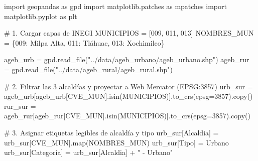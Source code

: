 \documentclass[
  spanish,
  letterpaper,
  DIV=11,
  numbers=noendperiod]{scrartcl}
\newenvironment{Shaded}{\begin{snugshade}}{\end{snugshade}}
\newcommand{\BuiltInTok}[1]{\textcolor[rgb]{0.00,0.23,0.31}{#1}}
\newcommand{\CommentTok}[1]{\textcolor[rgb]{0.37,0.37,0.37}{#1}}
\newcommand{\DecValTok}[1]{\textcolor[rgb]{0.68,0.00,0.00}{#1}}
\newcommand{\ImportTok}[1]{\textcolor[rgb]{0.00,0.46,0.62}{#1}}
\newcommand{\NormalTok}[1]{\textcolor[rgb]{0.00,0.23,0.31}{#1}}
\newcommand{\OperatorTok}[1]{\textcolor[rgb]{0.37,0.37,0.37}{#1}}
\newcommand{\StringTok}[1]{\textcolor[rgb]{0.13,0.47,0.30}{#1}}
\begin{document}
\begin{Shaded}
\begin{Highlighting}[]
\ImportTok{import}\NormalTok{ geopandas }\ImportTok{as}\NormalTok{ gpd}
\ImportTok{import}\NormalTok{ matplotlib.patches }\ImportTok{as}\NormalTok{ mpatches}
\ImportTok{import}\NormalTok{ matplotlib.pyplot }\ImportTok{as}\NormalTok{ plt}

\CommentTok{\# 1. Cargar capas de INEGI}
\NormalTok{MUNICIPIOS }\OperatorTok{=}\NormalTok{ [}\StringTok{\textquotesingle{}009\textquotesingle{}}\NormalTok{, }\StringTok{\textquotesingle{}011\textquotesingle{}}\NormalTok{, }\StringTok{\textquotesingle{}013\textquotesingle{}}\NormalTok{]}
\NormalTok{NOMBRES\_MUN }\OperatorTok{=}\NormalTok{ \{}\StringTok{\textquotesingle{}009\textquotesingle{}}\NormalTok{: }\StringTok{\textquotesingle{}Milpa Alta\textquotesingle{}}\NormalTok{, }\StringTok{\textquotesingle{}011\textquotesingle{}}\NormalTok{: }\StringTok{\textquotesingle{}Tláhuac\textquotesingle{}}\NormalTok{, }\StringTok{\textquotesingle{}013\textquotesingle{}}\NormalTok{: }\StringTok{\textquotesingle{}Xochimilco\textquotesingle{}}\NormalTok{\}}

\NormalTok{ageb\_urb }\OperatorTok{=}\NormalTok{ gpd.read\_file(}\StringTok{"../data/ageb\_urbano/ageb\_urbano.shp"}\NormalTok{)}
\NormalTok{ageb\_rur }\OperatorTok{=}\NormalTok{ gpd.read\_file(}\StringTok{"../data/ageb\_rural/ageb\_rural.shp"}\NormalTok{)}

\CommentTok{\# 2. Filtrar las 3 alcaldías y proyectar a Web Mercator (EPSG:3857)}
\NormalTok{urb\_sur }\OperatorTok{=}\NormalTok{ ageb\_urb[ageb\_urb[}\StringTok{\textquotesingle{}CVE\_MUN\textquotesingle{}}\NormalTok{].isin(MUNICIPIOS)].to\_crs(epsg}\OperatorTok{=}\DecValTok{3857}\NormalTok{).copy()}
\NormalTok{rur\_sur }\OperatorTok{=}\NormalTok{ ageb\_rur[ageb\_rur[}\StringTok{\textquotesingle{}CVE\_MUN\textquotesingle{}}\NormalTok{].isin(MUNICIPIOS)].to\_crs(epsg}\OperatorTok{=}\DecValTok{3857}\NormalTok{).copy()}

\CommentTok{\# 3. Asignar etiquetas legibles de alcaldía y tipo}
\NormalTok{urb\_sur[}\StringTok{\textquotesingle{}Alcaldia\textquotesingle{}}\NormalTok{] }\OperatorTok{=}\NormalTok{ urb\_sur[}\StringTok{\textquotesingle{}CVE\_MUN\textquotesingle{}}\NormalTok{].}\BuiltInTok{map}\NormalTok{(NOMBRES\_MUN)}
\NormalTok{urb\_sur[}\StringTok{\textquotesingle{}Tipo\textquotesingle{}}\NormalTok{] }\OperatorTok{=} \StringTok{\textquotesingle{}Urbano\textquotesingle{}}
\NormalTok{urb\_sur[}\StringTok{\textquotesingle{}Categoria\textquotesingle{}}\NormalTok{] }\OperatorTok{=}\NormalTok{ urb\_sur[}\StringTok{\textquotesingle{}Alcaldia\textquotesingle{}}\NormalTok{] }\OperatorTok{+} \StringTok{" {-} Urbano"}


\end{Highlighting}
\end{Shaded}
\end{document}
